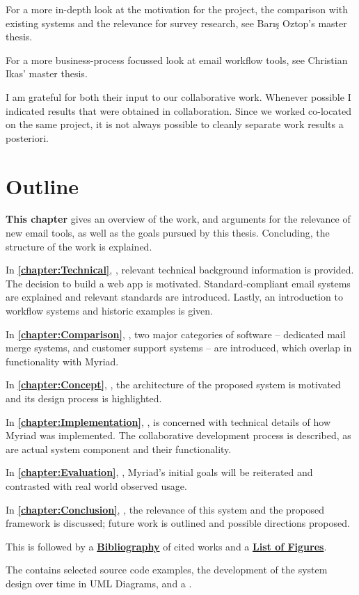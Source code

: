For a more in-depth look at the motivation for the project, the comparison with existing systems and the relevance for survey research, see Barış Oztop's master thesis.

For a more business-process focussed look at email workflow tools, see Christian Ikas' master thesis.

I am grateful for both their input to our collaborative work. Whenever possible I indicated results that were obtained in collaboration. Since we worked co-located on the same project, it is not always possible to cleanly separate work results a posteriori.

\section{Outline}

\textbf{This chapter} gives an overview of the work, and arguments for the relevance of new email tools, as well as the goals pursued by this thesis. Concluding, the structure of the work is explained.

In \textbf{\autoref{chapter:Technical}}, \textbf{}, relevant technical background information is provided. The decision to build a web app is motivated. Standard-compliant email systems are explained and relevant standards are introduced. Lastly, an introduction to workflow systems and historic examples is given.

In \textbf{\autoref{chapter:Comparison}}, \textbf{},  two major categories of software -- dedicated mail merge systems, and customer support systems -- are introduced, which overlap in functionality with Myriad.

In \textbf{\autoref{chapter:Concept}}, \textbf{}, the architecture of the proposed system is motivated and its design process is highlighted.

In \textbf{\autoref{chapter:Implementation}}, \textbf{}, is concerned with technical details of how Myriad was implemented. The collaborative development process is described, as are actual system component and their functionality.

In \textbf{\autoref{chapter:Evaluation}}, \textbf{}, Myriad's initial goals will be reiterated and contrasted with real world observed usage.

In \textbf{\autoref{chapter:Conclusion}}, \textbf{},  the relevance of this system and the proposed framework is discussed; future work is outlined and possible directions proposed.

This is followed by a \textbf{\hyperref[chapter:Bibliography]{Bibliography}} of cited works and a \textbf{\hyperref[chapter:Figures]{List of Figures}}.

The \textbf{} contains selected source code examples, the development of the system design over time in UML Diagrams, and a \textbf{}.


